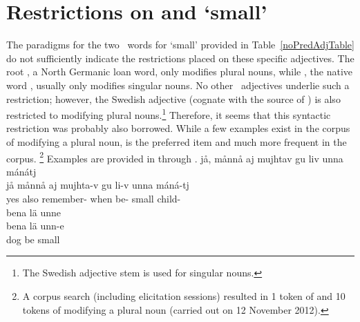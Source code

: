 \section{Restrictions on  and  ‘small’}\label{smallADJs}
The paradigms for the two \PS\ words for ‘small’ provided in Table~\vref{noPredAdjTable} do not sufficiently indicate the restrictions placed on these specific adjectives. The root , a North Germanic loan word, only modifies plural nouns, while \mbox{,} %
the native word \citep[265]{Sammallahti1998}, usually only modifies singular nouns. 
No other \PS\ adjectives underlie such a restriction; however, the Swedish adjective  (cognate with the source of ) is also restricted to modifying plural nouns.\footnote{The Swedish adjective stem  is used for singular nouns.} 
Therefore, it seems that this syntactic restriction was probably also borrowed. While a few examples exist in the corpus of  modifying a plural noun,  is the preferred item and much more frequent in the corpus.%
\footnote{A corpus search (including elicitation sessions) resulted in 1 token of  and 10 tokens of  modifying a plural noun (carried out on 12 November 2012).} 
Examples are provided in  through .
\ea\label{smallADJex1}
\glll	jå, månnå aj mujhtav gu liv unna mánátj\\
	jå månnå aj mujhta-v gu li-v unna máná-tj\\
	yes  also remember- when be- small child-\BS{}\\\nopagebreak
{}	
\z
\ea\label{smallADJex2}
\glll	bena lä unne\\
	bena lä unn-e\\
	dog\BS{} be\BS{} small\BS{}\\\nopagebreak
{}	
